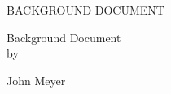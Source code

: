 \documentclass[12pt, oneside]{book2}
\newcommand{\documentTitle}{BACKGROUND DOCUMENT}
\newcommand{\documentSubtitle}{Background Document}
\newcommand{\documentAuthor}{John Meyer}
\newcommand{\documentYear}{2020}
\newcommand{\thesisAdvisor}{Daniela Inclezan, Ph. D}
\newcommand{\thesisFirstReader}{Alan Ferrenberg, Ph. D}
\newcommand{\thesisSecondReader}{Matthew Stephan, Ph. D}
\theoremstyle{definition}
\begin{document}
\begin{titlepage}
\begin{center}

    \documentTitle

    \vspace{1.5cm}

    \documentSubtitle \\

    by


    \documentAuthor

\end{center}
\thispagestyle{empty}
\end{titlepage}
\end{document}
